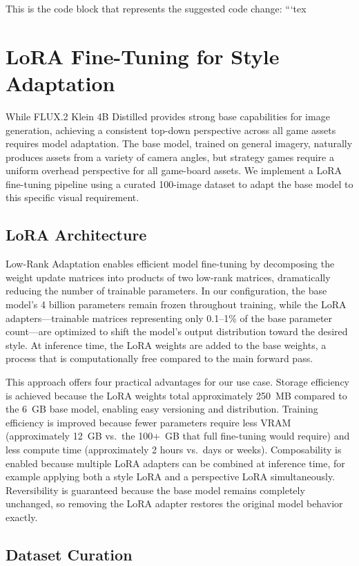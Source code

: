 \documentclass[conference]{IEEEtran}
\begin{document}
This is the code block that represents the suggested code change:
```tex
\section{LoRA Fine-Tuning for Style Adaptation}
\label{sec:lora}

While FLUX.2 Klein 4B Distilled provides strong base capabilities for image generation, achieving a consistent top-down perspective across all game assets requires model adaptation. The base model, trained on general imagery, naturally produces assets from a variety of camera angles, but strategy games require a uniform overhead perspective for all game-board assets. We implement a LoRA fine-tuning pipeline using a curated 100-image dataset to adapt the base model to this specific visual requirement.

\subsection{LoRA Architecture}

Low-Rank Adaptation enables efficient model fine-tuning by decomposing the weight update matrices into products of two low-rank matrices, dramatically reducing the number of trainable parameters. In our configuration, the base model's 4 billion parameters remain frozen throughout training, while the LoRA adapters---trainable matrices representing only 0.1--1\% of the base parameter count---are optimized to shift the model's output distribution toward the desired style. At inference time, the LoRA weights are added to the base weights, a process that is computationally free compared to the main forward pass.

This approach offers four practical advantages for our use case. Storage efficiency is achieved because the LoRA weights total approximately 250~MB compared to the 6~GB base model, enabling easy versioning and distribution. Training efficiency is improved because fewer parameters require less VRAM (approximately 12~GB vs.\ the 100+~GB that full fine-tuning would require) and less compute time (approximately 2 hours vs.\ days or weeks). Composability is enabled because multiple LoRA adapters can be combined at inference time, for example applying both a style LoRA and a perspective LoRA simultaneously. Reversibility is guaranteed because the base model remains completely unchanged, so removing the LoRA adapter restores the original model behavior exactly.

\subsection{Dataset Curation}
\end{document}

